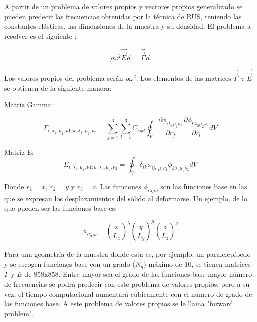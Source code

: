 \documentclass[12pt]{article}
\begin{document}
A partir de un problema de valores propios y vectores propios generalizado se pueden predecir las frecuencias obtenidas por la técnica de RUS, teniendo las constantes elásticas, las dimensiones de la muestra y su densidad. El problema a resolver es el siguiente \cite{Leisure_1997}:

\begin{equation}
    \rho \omega^2 \vec{\vec{E}} \vec{a} = \vec{\vec{\Gamma}} \vec{a} 
\end{equation}

Los valores propios del problema serán $\rho \omega^2$. Los elementos de las matrices $\vec{\vec{\Gamma}}$ y $\vec{\vec{E}}$ se obtienen de la siguiente manera: 

Matriz Gamma: 

\begin{equation}
    \Gamma_{i, \lambda_1, \mu_1,  \nu1; k, \lambda_2, \mu_2, \nu_2} = \sum_{j=1}^{3} \sum_{l=1}^{3} {C_{ijkl} \oint_{V}{\frac{\partial \phi_{i \lambda_{1} \mu_1 \nu_1}}{\partial r_j} \frac{\partial \phi_{k \lambda_2 \mu_2 \nu_2}}{\partial r_l} dV}}
\end{equation}

Matriz E:
\begin{equation}
    E_{i, \lambda_1, \mu_1,  \nu1; k, \lambda_2, \mu_2, \nu_2} = \oint_{V}{\delta_{ik} \phi_{i \lambda_1 \mu_1 \nu_1}  \phi_{k \lambda_2 \mu_2 \nu_2} dV}
\end{equation}

Donde $r_1 = x$, $r_2 = y$ y  $r_3 = z$. Las funciones $\phi_{i \lambda \mu \nu}$ son las funciones base en las que se expresan los desplazamientos del sólido al deformarse. Un ejemplo, de lo que pueden ser las funciones base es: 

\begin{equation}
    \phi_{i \lambda \mu \nu} = \left(\frac{x}{L_x} \right)^{\lambda} \left(\frac{y}{L_y} \right)^{\mu} \left(\frac{z}{L_z} \right)^{\nu}
\end{equation}

Para una geometría de la muestra donde esta es, por ejemplo, un paralelepípedo y se escogen funciones base con un grado ($N_g$) máximo de 10, se tienen matrices $\Gamma$ y $E$ de 858x858. Entre mayor sea el grado de las funciones base mayor número de frecuencias se podrá predecir con este problema de valores propios, pero a su vez, el tiempo computacional aumentará cúbicamente con el número de grado de las funciones base. A este problema de valores propios se le llama "forward problem".
\end{document}

